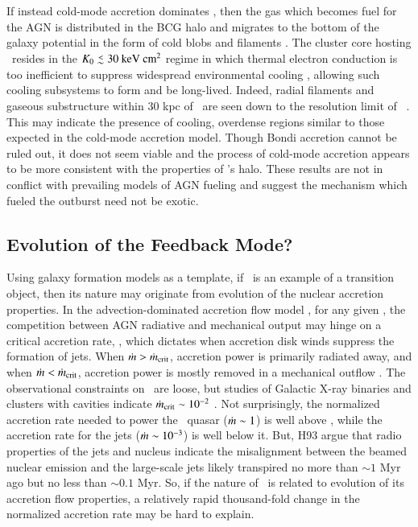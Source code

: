 \documentclass[referee,traditabstract]{aa}
\begin{document}
If instead cold-mode accretion dominates \citep{pizzolato05}, then the
gas which becomes fuel for the AGN is distributed in the BCG halo and
migrates to the bottom of the galaxy potential in the form of cold
blobs and filaments \citep{2010MNRAS.408..961P}. The cluster core
hosting \irs\ resides in the $\kna \la 30 ~\ent$ regime in which
thermal electron conduction is too inefficient to suppress widespread
environmental cooling \citep{conduction}, allowing such cooling
subsystems to form and be long-lived. Indeed, radial filaments and
gaseous substructure within 30 kpc of \irs\ are seen down to the
resolution limit of \hst\ \citep{1999Ap&SS.266..113A}. This may
indicate the presence of cooling, overdense regions similar to those
expected in the cold-mode accretion model. Though Bondi accretion
cannot be ruled out, it does not seem viable and the process of
cold-mode accretion appears to be more consistent with the properties
of \irs's halo. These results are not in conflict with prevailing
models of AGN fueling and suggest the mechanism which fueled the
outburst need not be exotic.

\subsection{Evolution of the Feedback Mode?}

Using galaxy formation models as a template, if \irs\ is an example of
a transition object, then its nature may originate from evolution of
the nuclear accretion properties. In the advection-dominated accretion
flow model \citep{adaf}, for any given \mbh, the competition between
AGN radiative and mechanical output may hinge on a critical accretion
rate, \dmcrit, which dictates when accretion disk winds suppress the
formation of jets. When $\dot{m} > \dot{m}_{\rm{crit}}$, accretion power is
primarily radiated away, and when $\dot{m} < \dot{m}_{\rm{crit}}$, accretion power
is mostly removed in a mechanical outflow
\citep{1997ApJ...489..865E}. The observational constraints on
\dmcrit\ are loose, but studies of Galactic X-ray binaries and
clusters with cavities indicate $\dot{m}_{\rm{crit}} \sim 10^{-2}$
\citep[\eg][]{2003MNRAS.344...60G, 2008NewAR..51..733N, minaspin}. Not
surprisingly, the normalized accretion rate needed to power the
\irs\ quasar ($\dot{m} \sim 1$) is well above \dmcrit, while the
accretion rate for the jets ($\dot{m} \sim 10^{-3}$) is well below
it. But, H93 argue that radio properties of the jets and nucleus
indicate the misalignment between the beamed nuclear emission and the
large-scale jets likely transpired no more than $\sim 1$ Myr ago but
no less than $\sim 0.1$ Myr. So, if the nature of \irs\ is related to
evolution of its accretion flow properties, a relatively rapid
thousand-fold change in the normalized accretion rate may be hard to
explain.
\end{document}
